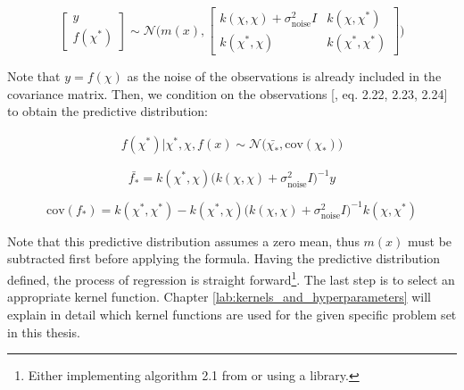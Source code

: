 \documentclass[11pt]{scrartcl}
\begin{document}
\begin{equation}
    \begin{bmatrix}
    y \\
    f(\chi^\ast)
    \end{bmatrix}
    \sim
    \mathcal{N} \Bigg(m(x),
        \begin{bmatrix}
        k(\chi, \chi) + \sigma_{\text{noise}}^2I & k(\chi, \chi^\ast) \\
        k(\chi^\ast, \chi) & k(\chi^\ast, \chi^\ast)
        \end{bmatrix}
    \Bigg)
\end{equation}

Note that $y = f(\chi)$ as the noise of the observations is already included in the
covariance matrix. Then, we condition on the observations [\cite{10.5555/1162254}, eq. 2.22, 2.23, 2.24] to obtain the predictive distribution:

\begin{equation}
\label{eq:gp_fitted}
\begin{split}
     f(\chi^\ast) | \chi^\ast, \chi, f(x) \sim \mathcal{N} \big(
    \bar{\chi_\ast}, \text{cov}(\chi_\ast)
    \big)
\end{split}
\end{equation}

\begin{equation}
    \label{eq:gp_fitted_mean}
    \bar{f_\ast} = k(\chi^\ast, \chi) \big(k(\chi, \chi) + \sigma_{\text{noise}}^2I\big)^{-1}y
\end{equation}

\begin{equation}
    \label{eq:gp_fitted_covariance}
    \text{cov}(f_\ast) = k(\chi^\ast, \chi^\ast) - k(\chi^\ast, \chi) \big( k(\chi, \chi) + \sigma_{\text{noise}}^2I \big)^{-1} k(\chi, \chi^\ast)
\end{equation}

Note that this predictive distribution assumes a zero mean, thus $m(x)$ must be subtracted first before applying the formula. Having the predictive distribution defined, the process of regression is straight forward\footnote{Either implementing algorithm 2.1 from \cite{10.5555/1162254} or using a library.}. The last step is to select an appropriate kernel function. Chapter \ref{lab:kernels_and_hyperparameters} will explain in detail which kernel functions are used for the given specific problem set in this thesis.
\end{document}
